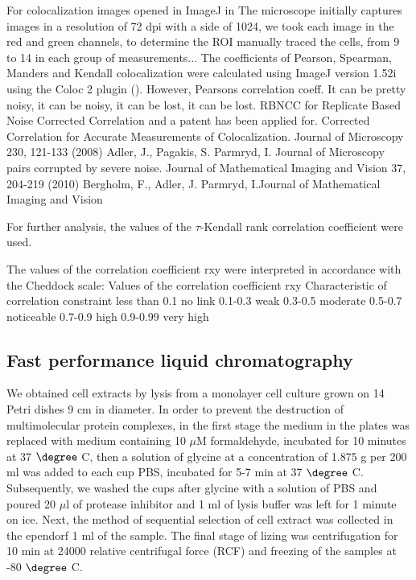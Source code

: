 \documentclass[english,authoryear]{elsarticle}
\begin{document}
For colocalization images opened in ImageJ in
The microscope initially captures images in a resolution of 72 dpi with a side of 1024, we took each image in the red and green channels, to determine the ROI manually traced the cells, from 9 to 14 in each group of measurements...
The coefficients of Pearson, Spearman, Manders and Kendall colocalization were calculated using ImageJ version 1.52i using the Coloc 2 plugin (\cite{rueden2017imagej2}).
However, Pearsons correlation coeff. It can be pretty noisy, it can be noisy, it can be lost, it can be lost. RBNCC for Replicate Based Noise Corrected Correlation and a patent has been applied for.
Corrected Correlation for Accurate Measurements of Colocalization. Journal of Microscopy 230, 121-133 (2008) Adler, J., Pagakis, S.  Parmryd, I. Journal of Microscopy pairs corrupted by severe noise.
Journal of Mathematical Imaging and Vision 37, 204-219 (2010) Bergholm, F., Adler, J.  Parmryd, I.Journal of Mathematical Imaging and Vision

For further analysis,
the values of
the $\tau$-Kendall rank correlation coefficient
 were used.

The values of the correlation coefficient rxy were interpreted in accordance with the Cheddock scale:
Values of the correlation coefficient rxy Characteristic of correlation constraint
less than 0.1 no link
0.1-0.3 weak
0.3-0.5 moderate
0.5-0.7 noticeable
0.7-0.9 high
0.9-0.99 very high
\cite{tinevez2017trackmate}
\cite{mclean2018trajr}

\subsection{Fast performance liquid chromatography}

We obtained cell extracts by lysis from a monolayer cell culture grown on 14 Petri dishes 9 cm in diameter.
In order to prevent the destruction of multimolecular protein complexes, in the first stage the medium in the plates was replaced with medium containing 10 $\mu$M formaldehyde, incubated for 10 minutes at 37 $\degree$ C, then a solution of glycine at a concentration of 1.875 g per 200 ml was added to each cup PBS, incubated for 5-7 min at 37 $\degree$  C. Subsequently, we washed the cups after glycine with a solution of PBS and poured 20 $\mu$l of protease inhibitor and 1 ml of lysis buffer was left for 1 minute on ice.
Next, the method of sequential selection of cell extract was collected in the ependorf 1 ml of the sample. The final stage of lizing was centrifugation for 10 min at 24000 relative centrifugal force (RCF) and freezing of the samples at -80 $\degree$  C.
\end{document}
